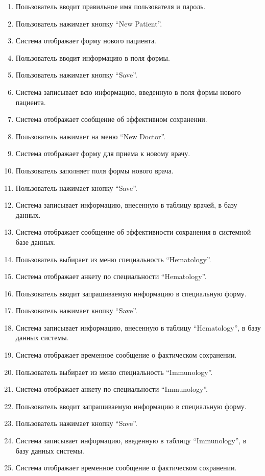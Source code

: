 \begin{enumerate}
	\item Пользователь вводит правильное имя пользователя и пароль.
	\item Пользователь нажимает кнопку ``New Patient''.
	\item Система отображает форму нового пациента.
	\item Пользователь вводит информацию в поля формы.
	\item Пользователь нажимает кнопку ``Save''.
	\item Система записывает всю информацию, введенную в поля формы нового пациента.
	\item Система отображает сообщение об эффективном сохранении.
	\item Пользователь нажимает на меню ``New Doctor''.
	\item Система отображает форму для приема к новому врачу.
	\item Пользователь заполняет поля формы нового врача.
	\item Пользователь нажимает кнопку ``Save''.
	\item Система записывает информацию, внесенную в таблицу врачей, в базу данных.
	\item Система отображает сообщение об эффективности сохранения в системной базе данных.
	\item Пользователь выбирает из меню специальность ``Hematology''.
	\item Система отображает анкету по специальности ``Hematology''.
	\item Пользователь вводит запрашиваемую информацию в специальную форму.
	\item Пользователь нажимает кнопку ``Save''.
	\item Система записывает информацию, внесенную в таблицу ``Hematology'', в базу данных системы.
	\item Система отображает временное сообщение о фактическом сохранении.
	\item Пользователь выбирает из меню специальность ``Immunology''.
	\item Система отображает анкету по специальности ``Immunology''.
	\item Пользователь вводит запрашиваемую информацию в специальную форму.
	\item Пользователь нажимает кнопку ``Save''.
	\item Система записывает информацию, введенную в таблицу ``Immunology'', в базу данных системы.
	\item Система отображает временное сообщение о фактическом сохранении.

\end{enumerate}
